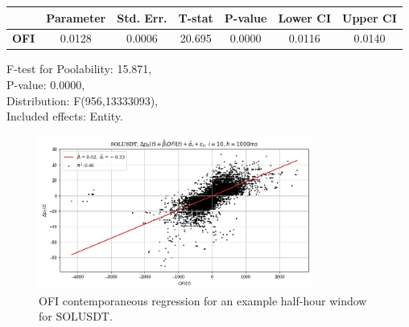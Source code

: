 \documentclass[a4paper, oneside, notitlepage]{book}
\begin{document}
\begin{table}
\begin{center}
\begin{tabular}{lclc}
\hline
\end{tabular}
\begin{tabular}{lcccccc}
             & \textbf{Parameter} & \textbf{Std. Err.} & \textbf{T-stat} & \textbf{P-value} & \textbf{Lower CI} & \textbf{Upper CI}  \\
\hline
\textbf{OFI} &       0.0128       &       0.0006       &      20.695     &      0.0000      &       0.0116      &       0.0140       \\
\hline
\end{tabular}
\end{center}
F-test for Poolability: 15.871, \\
P-value: 0.0000, \\
Distribution: F(956,13333093), \\
Included effects: Entity.
\end{table}

\begin{figure}[htpb]
    \centering
    \includegraphics[width=0.8\textwidth]{./images/solusdt_h=1000ms_contemp_OFI.png}
    \caption{OFI contemporaneous regression for an example half-hour window for SOLUSDT.}
\end{figure}

\clearpage
\end{document}
